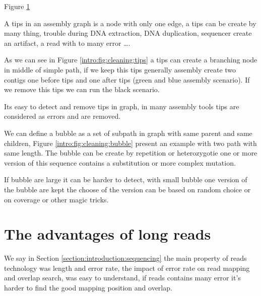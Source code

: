 \documentclass[./main.tex]{subfiles}
\begin{document}
Figure \ref{intro:fig:cleaning}

\begin{figure}[ht]
    \caption{}
    \label{intro:fig:cleaning}
\end{figure}

A tips in an assembly graph is a node with only one edge, a tips can be create by many thing, trouble during DNA extraction, DNA duplication, sequencer create an artifact, a read with to many error ….

As we can see in Figure \ref{intro:fig:cleaning:tips} a tips can create a branching node in middle of simple path, if we keep this tips generally assembly create two contigs one before tips and one after tips (green and blue assembly scenario). If we remove this tips we can run the black scenario.

Its easy to detect and remove tips in graph, in many assembly tools tips are considered as errors and are removed.

We can define a bubble as a set of subpath in graph with same parent and same children, Figure \ref{intro:fig:cleaning:bubble} present an example with two path with same length. The bubble can be create by repetition or heterozygotie one or more version of this sequence contains a substitution or more complex mutation.

If bubble are large it can be harder to detect, with small bubble one version of the bubble are kept the choose of the version can be based on random choice or on coverage or other magic tricks.

\section{The advantages of long reads}

We say in Section \ref{section:introduction:sequencing} the main property of reads technology was length and error rate, the impact of error rate on read mapping and overlap search, was easy to understand, if reads contains many error it's harder to find the good mapping position and overlap.
\end{document}
